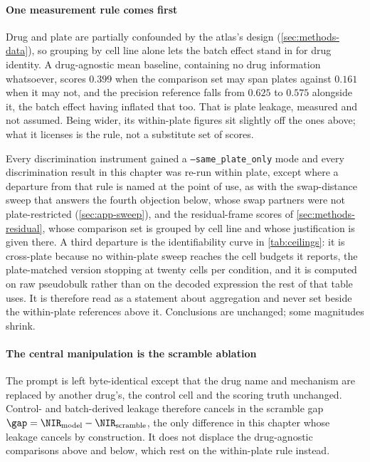 \paragraph{One measurement rule comes first} Drug and plate are partially
confounded by the atlas's design
(\cref{sec:methods-data}), so grouping by cell line alone lets the batch effect
stand in for drug identity. A drug-agnostic mean baseline, containing no drug
information whatsoever, scores $0.399$ when the comparison set may span plates
against $0.161$ when it may not, and the precision reference falls from $0.625$
to $0.575$ alongside it, the batch
effect having inflated that too. That is plate leakage, measured and not
assumed. Being wider, its within-plate figures sit slightly off the ones above;
what it licenses is the rule, not a substitute set of scores.

\begin{scopelimit}
Every discrimination instrument gained a \texttt{--same\_plate\_only} mode and
every discrimination result in this chapter was re-run within plate, except
where a departure from that rule is named at the point of use, as with the
swap-distance sweep that answers the fourth objection below, whose swap partners
were not plate-restricted (\cref{sec:app-sweep}), and the residual-frame scores
of \cref{sec:methods-residual}, whose comparison set is grouped by cell line and
whose justification is given there. A third departure is the identifiability
curve in \cref{tab:ceilings}: it is cross-plate because no within-plate sweep
reaches the cell budgets it reports, the plate-matched version stopping at
twenty cells per condition, and it is computed on raw pseudobulk rather than on
the decoded expression the rest of that table uses. It is therefore read as a
statement about aggregation and never set beside the within-plate references
above it. Conclusions are unchanged; some magnitudes shrink.
\end{scopelimit}

\paragraph{The central manipulation is the scramble ablation} The prompt is left
byte-identical except that the drug name and mechanism are replaced by another
drug's, the control cell and the scoring truth unchanged. Control- and batch-derived leakage therefore cancels in
the scramble gap $\gap = \NIR_{\textrm{model}} - \NIR_{\textrm{scramble}}$, the
only difference in this chapter whose leakage cancels by construction. It does
not displace the drug-agnostic comparisons above and below, which rest on the
within-plate rule instead.

